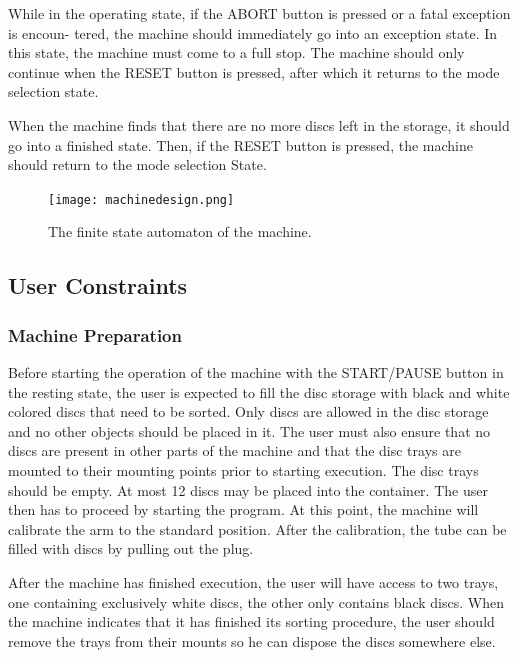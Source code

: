 \documentclass[a4paper,oneside,11pt]{article}
\begin{document}
While in the operating state, if the ABORT button is pressed or a fatal exception is encoun-
tered, the machine should immediately go into an exception state. In this state, the machine
must come to a full stop. The machine should only continue when the RESET button is pressed,
after which it returns to the mode selection state.

When the machine finds that there are no more discs left in the storage, it should go into a
finished state. Then, if the RESET button is pressed, the machine should return to the mode selection
State.

\begin{figure}[H]
	\centering
	\texttt{[image: machinedesign.png]}
	\caption{\label{machinedesign}The finite state automaton of the machine.}
\end{figure}

\subsection{User Constraints}
\subsubsection{Machine Preparation}
Before starting the operation of the machine with the START/PAUSE button in the resting state, the user is expected to fill the disc storage with black and
white colored discs that need to be sorted. Only discs are allowed in the disc storage and no
other objects should be placed in it. The user must also ensure that no discs are present in
other parts of the machine and that the disc trays are mounted to their mounting points prior
to starting execution. The disc trays should be empty. At most 12 discs may be placed into the
container. The user then has to proceed by starting the program. At this point, the machine will calibrate the arm to the standard position. After the calibration, the tube can be filled with
discs by pulling out the plug.

After the machine has finished execution, the user will have access to two trays, one containing exclusively white discs, the other only contains black discs. When the machine indicates
that it has finished its sorting procedure, the user should remove the trays from their mounts
so he can dispose the discs somewhere else.
\end{document}
